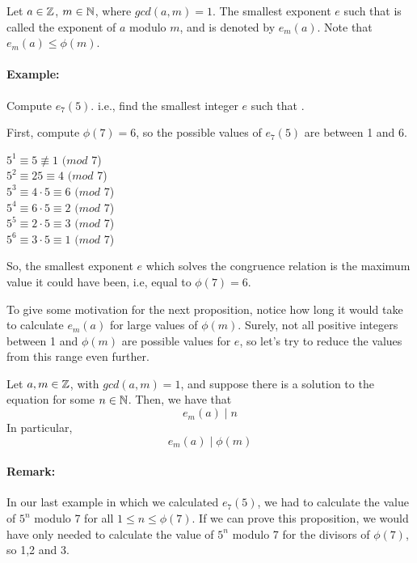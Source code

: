 \documentclass[../main.tex]{subfiles}
\begin{document}
\begin{defn}
    Let $a \in \mathbb{Z}$, $m \in \mathbb{N}$, where $gcd(a,m)=1$. The smallest exponent $e$ such that  is called the exponent of $a$ modulo $m$, and is denoted by $e_m(a)$. Note that $e_m(a) \leq \phi(m)$.
\end{defn}

\paragraph{Example:} Compute $e_7(5)$. i.e., find the smallest integer $e$ such that .
\begin{ans}
    First, compute $\phi(7)=6$, so the possible values of $e_7(5)$ are between 1 and 6.
    \begin{center}
        $5^1 \equiv 5 \not\equiv 1$ $(mod$ 7) \\
        $5^2 \equiv 25 \equiv 4$ $(mod$ 7) \\
        $5^3 \equiv 4 \cdot 5 \equiv 6$ $(mod$ 7) \\
        $5^4 \equiv 6\cdot 5 \equiv 2$ $(mod$ 7) \\
        $5^5 \equiv 2\cdot5 \equiv 3$ $(mod$ 7) \\
        $5^6 \equiv 3\cdot5 \equiv 1$ $(mod$ 7)
    \end{center}
    So, the smallest exponent $e$ which solves the congruence relation  is the maximum value it could have been, i.e, equal to $\phi(7)=6$.
\end{ans}
To give some motivation for the next proposition, notice how long it would take to calculate $e_m(a)$ for large values of $\phi(m)$. Surely, not all positive integers between 1 and $\phi(m)$ are possible values for $e$, so let's try to reduce the values from this range even further.
\begin{prop}
    Let $a,m \in \mathbb{Z}$, with $gcd(a,m)=1$, and suppose there is a solution to the equation  for some $n\in \mathbb{N}$. Then, we have that $$e_m(a) \mid n$$ In particular, $$e_m(a) \mid \phi(m)$$
\end{prop}
\paragraph{Remark:} In our last example in which we calculated $e_7(5)$, we had to calculate the value of $5^n$ modulo 7 for all $1\leq n\leq \phi(7)$. If we can prove this proposition, we would have only needed to calculate the value of $5^n$ modulo 7 for the divisors of $\phi(7)$, so 1,2 and 3.
\end{document}
